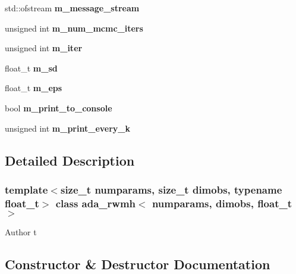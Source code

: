 \begin{DoxyCompactItemize}
\item 
\mbox{\label{classada__rwmh_a7f8ad3832457b6cf2db86209f1d0815d}} 
std\+::ofstream {\bfseries m\+\_\+message\+\_\+stream}
\item 
\mbox{\label{classada__rwmh_a2185c88558348b04248284435ef33aed}} 
unsigned int {\bfseries m\+\_\+num\+\_\+mcmc\+\_\+iters}
\item 
\mbox{\label{classada__rwmh_a26cc21e17b8aa2eecb780dcbdd2bbf8a}} 
unsigned int {\bfseries m\+\_\+iter}
\item 
\mbox{\label{classada__rwmh_a4a595db36214f8cc05d131e705a7a508}} 
float\+\_\+t {\bfseries m\+\_\+sd}
\item 
\mbox{\label{classada__rwmh_ab489b16e306c62dc58c225c64e1b9ee7}} 
float\+\_\+t {\bfseries m\+\_\+eps}
\item 
\mbox{\label{classada__rwmh_ae62e97c4a6916f1d6b3c70bd8a9fa176}} 
bool {\bfseries m\+\_\+print\+\_\+to\+\_\+console}
\item 
\mbox{\label{classada__rwmh_ad919646e11969c8bc93360b88c8a3884}} 
unsigned int {\bfseries m\+\_\+print\+\_\+every\+\_\+k}
\end{DoxyCompactItemize}


\subsection{Detailed Description}
\subsubsection*{template$<$size\+\_\+t numparams, size\+\_\+t dimobs, typename float\+\_\+t$>$\newline
class ada\+\_\+rwmh$<$ numparams, dimobs, float\+\_\+t $>$}

\begin{DoxyAuthor}{Author}
t 
\end{DoxyAuthor}


\subsection{Constructor \& Destructor Documentation}
\mbox{\label{classada__rwmh_a6bf39cdf5a3a5aec9baa3018364131d6}} 
